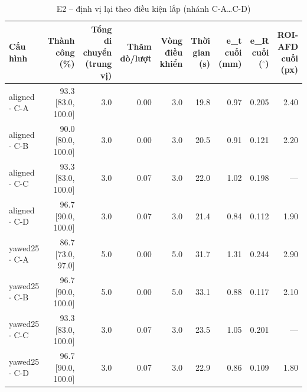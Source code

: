 \begin{table}[t]
\centering
\caption{E2 – định vị lại theo điều kiện lắp (nhánh C-A…C-D)}
\label{tab:e2}
\begin{tabular}{lrrrrrrrr}
\toprule
Cấu hình & Thành công (\%) & Tổng di chuyển (trung vị) & Thăm dò/lượt & Vòng điều khiển & Thời gian (s) & e\_t cuối (mm) & e\_R cuối ($^\circ$) & ROI-AFD cuối (px) \\
\midrule
aligned $\cdot$ C-A & 93.3 [83.0, 100.0] & 3.0 & 0.00 & 3.0 & 19.8 & 0.97 & 0.205 & 2.40 \\
aligned $\cdot$ C-B & 90.0 [80.0, 100.0] & 3.0 & 0.00 & 3.0 & 20.5 & 0.91 & 0.121 & 2.20 \\
aligned $\cdot$ C-C & 93.3 [83.0, 100.0] & 3.0 & 0.07 & 3.0 & 22.0 & 1.02 & 0.198 & --- \\
aligned $\cdot$ C-D & 96.7 [90.0, 100.0] & 3.0 & 0.07 & 3.0 & 21.4 & 0.84 & 0.112 & 1.90 \\
yawed25 $\cdot$ C-A & 86.7 [73.0, 97.0] & 5.0 & 0.00 & 5.0 & 31.7 & 1.31 & 0.244 & 2.90 \\
yawed25 $\cdot$ C-B & 96.7 [90.0, 100.0] & 5.0 & 0.00 & 5.0 & 33.1 & 0.88 & 0.117 & 2.10 \\
yawed25 $\cdot$ C-C & 93.3 [83.0, 100.0] & 3.0 & 0.07 & 3.0 & 23.5 & 1.05 & 0.201 & --- \\
yawed25 $\cdot$ C-D & 96.7 [90.0, 100.0] & 3.0 & 0.07 & 3.0 & 22.9 & 0.86 & 0.109 & 1.80 \\
\bottomrule
\end{tabular}
\end{table}
